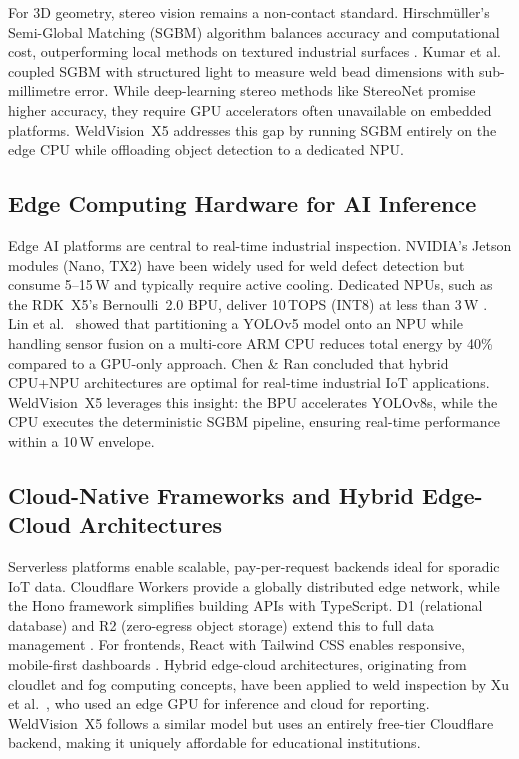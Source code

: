 \documentclass[12pt,a4paper]{article}
\begin{document}
For 3D geometry, stereo vision remains a non-contact standard. Hirschm\"uller's \cite{Hirschmuller2008}
Semi-Global Matching (SGBM) algorithm balances accuracy and computational cost, outperforming local methods
on textured industrial surfaces \cite{Scharstein2002}. Kumar et al.\ \cite{Kumar2019} coupled SGBM with
structured light to measure weld bead dimensions with sub-millimetre error. While deep-learning stereo methods
like StereoNet \cite{Khamis2018} promise higher accuracy, they require GPU accelerators often unavailable on
embedded platforms. WeldVision~X5 addresses this gap by running SGBM entirely on the edge CPU while
offloading object detection to a dedicated NPU.

\subsection{Edge Computing Hardware for AI Inference}

Edge AI platforms are central to real-time industrial inspection. NVIDIA's Jetson modules (Nano, TX2) have
been widely used for weld defect detection \cite{Li2021} but consume 5--15\,W and typically require active
cooling. Dedicated NPUs, such as the RDK~X5's Bernoulli~2.0 BPU, deliver 10\,TOPS (INT8) at less than 3\,W
\cite{RDKX52024}. Lin et al.\ \cite{Lin2023} showed that partitioning a YOLOv5 model onto an NPU while
handling sensor fusion on a multi-core ARM CPU reduces total energy by 40\% compared to a GPU-only approach.
Chen \& Ran \cite{Chen2019} concluded that hybrid CPU+NPU architectures are optimal for real-time industrial
IoT applications. WeldVision~X5 leverages this insight: the BPU accelerates YOLOv8s, while the CPU executes
the deterministic SGBM pipeline, ensuring real-time performance within a 10\,W envelope.

\subsection{Cloud-Native Frameworks and Hybrid Edge-Cloud Architectures}

Serverless platforms enable scalable, pay-per-request backends ideal for sporadic IoT data. Cloudflare
Workers provide a globally distributed edge network, while the Hono framework \cite{Wada2023} simplifies
building APIs with TypeScript. D1 (relational database) and R2 (zero-egress object storage) extend this to
full data management \cite{Cloudflare2024}. For frontends, React with Tailwind CSS enables responsive,
mobile-first dashboards \cite{Ene2022}. Hybrid edge-cloud architectures, originating from cloudlet
\cite{Satyanarayanan2009} and fog computing \cite{Bonomi2012} concepts, have been applied to weld inspection
by Xu et al.\ \cite{Xu2022}, who used an edge GPU for inference and cloud for reporting. WeldVision~X5
follows a similar model but uses an entirely free-tier Cloudflare backend, making it uniquely affordable for
educational institutions.
\end{document}
